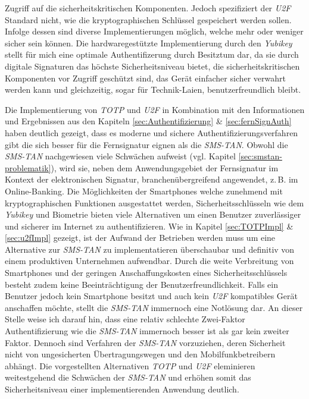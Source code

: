 \documentclass[11pt,a4paper,ngerman]{scrreprt}
\begin{document}
Zugriff auf die sicherheitskritischen Komponenten. Jedoch spezifiziert der \textit{U2F} Standard nicht, wie die kryptographischen Schlüssel gespeichert werden sollen. Infolge dessen sind diverse Implementierungen möglich, welche mehr oder weniger sicher sein können. Die hardwaregestützte Implementierung durch den \textit{Yubikey} stellt für mich eine optimale Authentifizerung durch Besitztum dar, da sie durch digitale Signaturen das höchste Sicherheitsniveau bietet, die sicherheitskritischen Komponenten vor Zugriff geschützt sind, das Gerät einfacher sicher verwahrt werden kann und gleichzeitig, sogar für Technik-Laien, benutzerfreundlich bleibt.

Die Implementierung von \textit{TOTP} und \textit{U2F} in Kombination mit den Informationen und Ergebnissen aus den Kapiteln \ref{sec:Authentifizierung} \& \ref{sec:fernSignAuth} haben deutlich gezeigt, dass es moderne und sichere Authentifizierungsverfahren gibt die sich besser für die Fernsignatur eignen als die \textit{SMS-TAN}. Obwohl die \textit{SMS-TAN} nachgewiesen viele Schwächen aufweist (vgl. Kapitel \ref{sec:smstan-problematik}), wird sie, neben dem Anwendungsgebiet der Fernsignatur im Kontext der elektronischen Signatur, branchenübergreifend angewendet, z.\,B. im Online-Banking. Die Möglichkeiten der Smartphones welche zunehmend mit kryptographischen Funktionen ausgestattet werden, Sicherheitsschlüsseln wie dem \textit{Yubikey} und Biometrie bieten viele Alternativen um einen Benutzer zuverlässiger und sicherer im Internet zu authentifizieren. Wie in Kapitel \ref{sec:TOTPImpl} \& \ref{sec:u2fImpl} gezeigt, ist der Aufwand der Betrieben werden muss um eine Alternative zur \textit{SMS-TAN} zu implementatieren überschaubar und definitiv von einem produktiven Unternehmen aufwendbar. Durch die weite Verbreitung von Smartphones und der geringen Anschaffungskosten eines Sicherheitsschlüssels besteht zudem keine Beeinträchtigung der Benutzerfreundlichkeit. Falls ein Benutzer jedoch kein Smartphone besitzt und auch kein \textit{U2F} kompatibles Gerät anschaffen möchte, stellt die \textit{SMS-TAN} immernoch eine Notlösung dar. An dieser Stelle weise ich darauf hin, dass eine relativ schlechte Zwei-Faktor Authentifizierung wie die \textit{SMS-TAN} immernoch besser ist als gar kein zweiter Faktor. Dennoch sind Verfahren der \textit{SMS-TAN} vorzuziehen, deren Sicherheit nicht von ungesicherten Übertragungswegen und den Mobilfunkbetreibern abhängt. Die vorgestellten Alternativen \textit{TOTP} und \textit{U2F} eleminieren weitestgehend die Schwächen der \textit{SMS-TAN} und erhöhen somit das Sicherheitsniveau einer implementierenden Anwendung deutlich.
\end{document}
